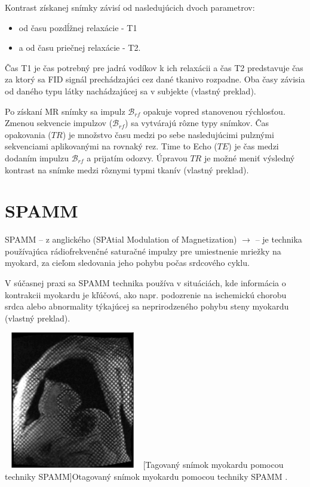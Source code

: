 Kontrast získanej snímky závisí od nasledujúcich dvoch parametrov:

\begin {itemize}
\item {od času pozdĺžnej relaxácie - T1}
\item {a od času priečnej relaxácie - T2.}
\end {itemize}

Čas T1 je čas potrebný pre jadrá vodíkov k ich relaxácii a čas T2 predstavuje čas za ktorý sa FID signál prechádzajúci cez dané tkanivo rozpadne. Oba časy závisia od daného typu látky nachádzajúcej sa v subjekte \cite{basic_principles_of_mri} (vlastný preklad).

Po získaní MR snímky sa impulz $\mathcal{B}_{rf}$ opakuje vopred stanovenou rýchlosťou. Zmenou sekvencie impulzov ($\mathcal{B}_{rf}$) sa vytvárajú rôzne typy snímkov. Čas opakovania ($TR$) je množstvo času medzi po sebe nasledujúcimi pulznými sekvenciami aplikovanými na rovnaký rez. Time to Echo ($TE$) je čas medzi dodaním impulzu $\mathcal{B}_{rf}$ a prijatím odozvy. Úpravou $TR$ je možné meniť výsledný kontrast na snímke medzi rôznymi typmi tkanív \cite{basic_principles_of_mri} (vlastný preklad). \clearpage

\section {SPAMM}

SPAMM -- z anglického (SPAtial Modulation of Magnetization) $\rightarrow$  -- je technika používajúca rádiofrekvenčné saturačné impulzy pre umiestnenie mriežky na myokard, za cieľom sledovania jeho pohybu počas srdcového cyklu.

V súčasnej praxi sa SPAMM technika používa v situáciách, kde informácia o kontrakcii myokardu je kľúčová, ako napr. podozrenie na ischemickú chorobu srdca alebo abnormality týkajúcej sa neprirodzeného pohybu steny myokardu \cite{spamm_description} (vlastný preklad).

\begin {center}
        \centering
        \includegraphics[width=6cm, height=6cm]{media/heart/tagged_heart.png}
        [Tagovaný snímok myokardu pomocou techniky SPAMM]{Otagovaný snímok myokardu pomocou techniky SPAMM \cite{spamm_description}.}
\end {center}

